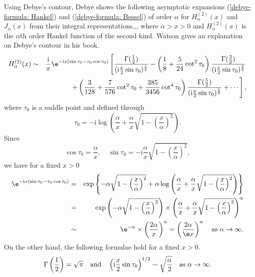 \documentclass[12pt]{report}
\begin{document}
\label{Debye formula}
Using Debye's contour, Debye shows the following asymptotic expansions (\ref{debye-formula: Hankel}) and (\ref{debye-formula: Bessel}) of order $\alpha$ for $H^{(2)}_{\alpha}(x)$ and $J_\alpha(x)$ from their integral representations\cite{Debye},\cite{Olver1997},\cite{Watson1966}, where $\alpha>x>0$ and $H^{(2)}_{\alpha}(x)$ is the $\alpha$th order Hankel function of the second kind. Watson gives an explanation on Debye's contour in his book\cite{Watson1966}.
\begin{eqnarray}
H^{(2)}_{\alpha}(x)&\sim&\frac{\mathrm{i}}{\pi}\e^{-\mathrm{i}x(\sin\tau_0-\tau_0\cos\tau_0)}\left[\frac{\Gamma(\frac{1}{2})}{(\mathrm{i}\frac{x}{2}\sin\tau_0)^{\frac{1}{2}}}-\left(\frac{1}{8}+\frac{5}{24}\cot^2\tau_0\right)\frac{\Gamma(\frac{3}{2})}{(\mathrm{i}\frac{x}{2}\sin\tau_0)^{\frac{3}{2}}}\right. \nonumber\\
&&\left.+\left(\frac{3}{128}+\frac{7}{576}\cot^2\tau_0+\frac{385}{3456}\cot^4\tau_0\right)\frac{\Gamma(\frac{5}{2})}{(\mathrm{i}\frac{x}{2}\sin\tau_0)^{\frac{5}{2}}}+\cdots\right],
\label{debye-formula: Hankel}
\end{eqnarray}
where $\tau_0$ is a saddle point and defined through
\begin{equation}
\tau_0=-\mathrm{i}\log\left(\frac{\alpha}{x}+\frac{\alpha}{x}\sqrt{1-\left(\frac{x}{\alpha}\right)^2}\right).
\label{tau_0}
\end{equation}
Since 
\begin{displaymath}
\cos\tau_0=\frac{\alpha}{x}, \quad \sin\tau_0=-\mathrm{i}\frac{\alpha}{x}\sqrt{1-\left(\frac{x}{\alpha}\right)^2},
\end{displaymath}
we have for a fixed $x>0$
\begin{eqnarray*}
\e^{-\mathrm{i}x(\sin\tau_0-\tau_0\cos\tau_0)}&=&\exp\left\{-\alpha\sqrt{1-\left(\frac{x}{\alpha}\right)^2}+\alpha\log\left(\frac{\alpha}{x}+\frac{\alpha}{x}\sqrt{1-\left(\frac{x}{\alpha}\right)^2}\right)\right\} \\
&=&\exp\left(-\alpha\sqrt{1-\left(\frac{x}{\alpha}\right)^2}\right) \times \left(\frac{\alpha}{x}+\frac{\alpha}{x}\sqrt{1-\left(\frac{x}{\alpha}\right)^2}\right)^\alpha \\
&\sim& \e^{-\alpha} \times \left(\frac{2\alpha}{x}\right)^\alpha=\left(\frac{2\alpha}{\e x}\right)^\alpha \quad {\rm as}\;\alpha\rightarrow\infty.
\end{eqnarray*}
On the other hand, the following formulae hold for a fixed $x>0$.
\begin{displaymath}
\Gamma\left(\frac{1}{2}\right)=\sqrt{\pi} \quad {\rm and} \quad \left(\mathrm{i}\frac{x}{2}\sin\tau_0\right)^{1/2} \sim \sqrt{\frac{\alpha}{2}}\quad {\rm as}\;\alpha\rightarrow\infty.
\end{displaymath}
\end{document}
